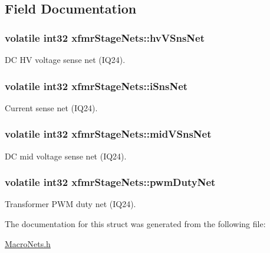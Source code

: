 \subsection{Field Documentation}
\hypertarget{a00009_af673ad18a7fbfd829202293dd019d25b}{
\subsubsection[{hv\-V\-Sns\-Net}]{\setlength{\rightskip}{0pt plus 5cm}volatile int32 xfmr\-Stage\-Nets\-::hv\-V\-Sns\-Net}}\label{a00009_af673ad18a7fbfd829202293dd019d25b}
D\-C H\-V voltage sense net (I\-Q24). \hypertarget{a00009_a794dc3b0f07e245bb54f830d86ad8fed}{
\subsubsection[{i\-Sns\-Net}]{\setlength{\rightskip}{0pt plus 5cm}volatile int32 xfmr\-Stage\-Nets\-::i\-Sns\-Net}}\label{a00009_a794dc3b0f07e245bb54f830d86ad8fed}
Current sense net (I\-Q24). \hypertarget{a00009_a6cf2860aba64beca1c5471fcc7432c07}{
\subsubsection[{mid\-V\-Sns\-Net}]{\setlength{\rightskip}{0pt plus 5cm}volatile int32 xfmr\-Stage\-Nets\-::mid\-V\-Sns\-Net}}\label{a00009_a6cf2860aba64beca1c5471fcc7432c07}
D\-C mid voltage sense net (I\-Q24). \hypertarget{a00009_a0c842e8cc854cd6665110f4ade15514f}{
\subsubsection[{pwm\-Duty\-Net}]{\setlength{\rightskip}{0pt plus 5cm}volatile int32 xfmr\-Stage\-Nets\-::pwm\-Duty\-Net}}\label{a00009_a0c842e8cc854cd6665110f4ade15514f}
Transformer P\-W\-M duty net (I\-Q24). 

The documentation for this struct was generated from the following file\-:\begin{DoxyCompactItemize}
\item 
\hyperlink{a00027}{Macro\-Nets.\-h}\end{DoxyCompactItemize}
